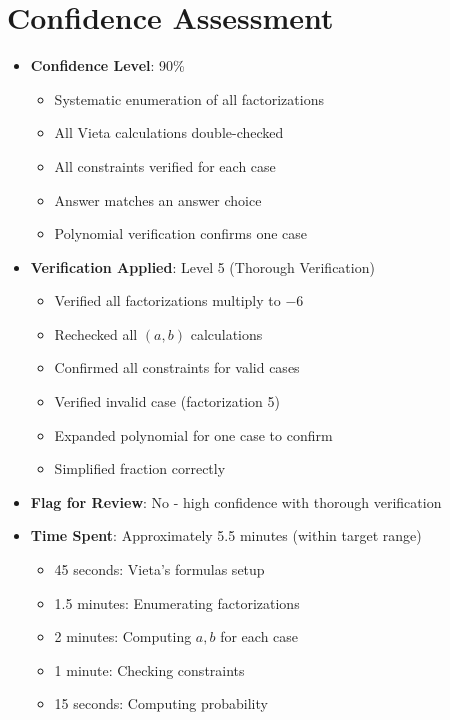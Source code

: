 \documentclass[12pt]{article}
\begin{document}
\section*{Confidence Assessment}
\begin{itemize}[leftmargin=*]
    \item \textbf{Confidence Level}: 90\%
    \begin{itemize}
        \item Systematic enumeration of all factorizations
        \item All Vieta calculations double-checked
        \item All constraints verified for each case
        \item Answer matches an answer choice
        \item Polynomial verification confirms one case
    \end{itemize}
    
    \item \textbf{Verification Applied}: Level 5 (Thorough Verification)
    \begin{itemize}
        \item Verified all factorizations multiply to $-6$
        \item Rechecked all $(a,b)$ calculations
        \item Confirmed all constraints for valid cases
        \item Verified invalid case (factorization 5)
        \item Expanded polynomial for one case to confirm
        \item Simplified fraction correctly
    \end{itemize}
    
    \item \textbf{Flag for Review}: No - high confidence with thorough verification
    
    \item \textbf{Time Spent}: Approximately 5.5 minutes (within target range)
    \begin{itemize}
        \item 45 seconds: Vieta's formulas setup
        \item 1.5 minutes: Enumerating factorizations
        \item 2 minutes: Computing $a, b$ for each case
        \item 1 minute: Checking constraints
        \item 15 seconds: Computing probability
    \end{itemize}
\end{itemize}
\end{document}
